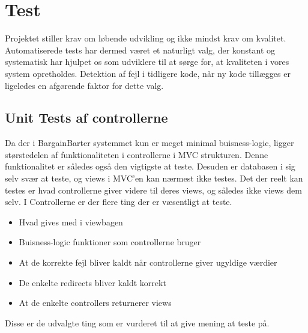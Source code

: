 \chapter{Test}

Projektet stiller krav om løbende udvikling og ikke mindst krav om kvalitet. 
Automatiserede tests har dermed været et naturligt valg, der konstant og systematisk har hjulpet os som udviklere til at sørge for, at kvaliteten i vores system opretholdes. Detektion af fejl i tidligere kode, når ny kode tillægges er ligeledes en afgørende faktor for dette valg.



\section{Unit Tests af controllerne}
Da der i BargainBarter systemmet kun er meget minimal buisness-logic, ligger størstedelen af funktionaliteten i controllerne i MVC strukturen. Denne funktionalitet er således også den vigtigste at teste. Desuden er databasen i sig selv svær at teste, og views i MVC'en kan nærmest ikke testes. Det der reelt kan testes er hvad controllerne giver videre til deres views, og således ikke views dem selv. I Controllerne er der flere ting der er væsentligt at teste.
\begin{itemize}
	\item Hvad gives med i viewbagen
	\item Buisness-logic funktioner som controllerne bruger
	\item At de korrekte fejl bliver kaldt når controllerne giver ugyldige værdier
	\item De enkelte redirects bliver kaldt korrekt
	\item At de enkelte controllers returnerer views
\end{itemize}       
Disse er de udvalgte ting som er vurderet til at give mening at teste på.

